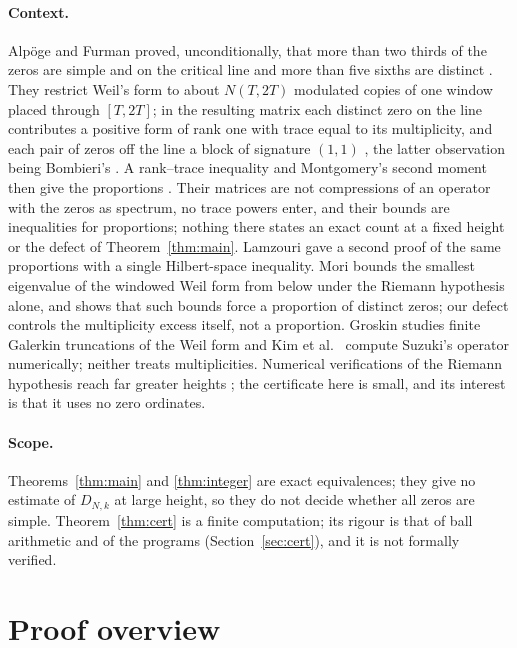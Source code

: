 \documentclass[11pt,a4paper]{article}
\theoremstyle{plain}
\theoremstyle{remark}
\begin{document}
\paragraph{Context.}
Alp\"oge and Furman \cite{alpoge-furman} proved, unconditionally, that more than two thirds of the zeros are simple
and on the critical line and more than five sixths are distinct \cite[Theorem~A, p.~1]{alpoge-furman}. They
restrict Weil's form to about $N(T,2T)$ modulated copies of one window placed through $[T,2T]$; in the resulting
matrix each distinct zero on the line contributes a positive form of rank one with trace equal to its multiplicity,
and each pair of zeros off the line a block of signature $(1,1)$ \cite[Proposition~4.1, p.~6]{alpoge-furman}, the
latter observation being Bombieri's \cite[§1.3, p.~3]{alpoge-furman}. A rank--trace inequality \cite[Lemma~3.2,
p.~5]{alpoge-furman} and Montgomery's second moment then give the proportions \cite[§1.2, (1.2),
p.~2]{alpoge-furman}. Their matrices are not compressions of an operator with the zeros as spectrum, no trace powers
enter, and their bounds are inequalities for proportions; nothing there states an exact count at a fixed height or
the defect of Theorem~\ref{thm:main}. Lamzouri \cite{lamzouri} gave a second proof of the same proportions with a
single Hilbert-space inequality. Mori \cite{mori} bounds the smallest
eigenvalue of the windowed Weil form from below under the Riemann hypothesis alone, and shows that such bounds force a
proportion of distinct zeros; our defect controls the multiplicity excess itself, not a proportion. Groskin
\cite{groskin} studies finite Galerkin truncations of the Weil form and Kim et al.\ \cite{kim} compute Suzuki's
operator numerically; neither treats multiplicities. Numerical verifications of the Riemann hypothesis reach far
greater heights \cite{platt-trudgian}; the certificate here is small, and its interest is that it uses no zero
ordinates.

\paragraph{Scope.}
Theorems~\ref{thm:main} and \ref{thm:integer} are exact equivalences; they give no estimate of $D_{N,k}$ at large
height, so they do not decide whether all zeros are simple. Theorem~\ref{thm:cert} is a finite computation; its
rigour is that of ball arithmetic and of the programs (Section~\ref{sec:cert}), and it is not formally verified.

\section{Proof overview}
\end{document}
